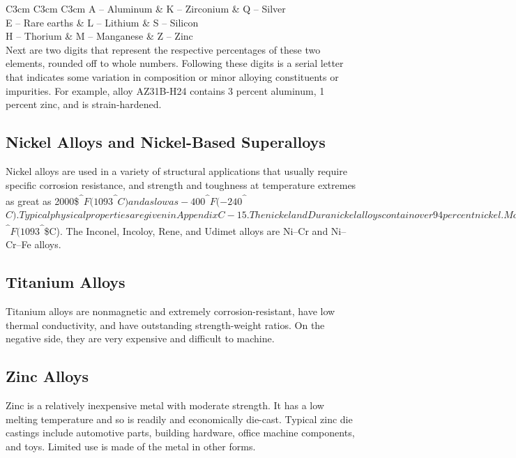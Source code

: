 \documentclass[a4paper,openany,12pt]{book}
\begin{document}
 C3cm C3cm C3cm A -- Aluminum \& K -- Zirconium \& Q -- Silver\\
E -- Rare earths \& L -- Lithium \& S -- Silicon\\
H -- Thorium \& M -- Manganese \& Z -- Zinc\\

Next are two digits that represent the respective percentages of these
two elements, rounded off to whole numbers. Following these digits is a
serial letter that indicates some variation in composition or minor
alloying constituents or impurities. For example, alloy AZ31B-H24
contains 3 percent aluminum, 1 percent zinc, and is strain-hardened.

\subsection{Nickel Alloys and Nickel-Based Superalloys}
\label{nickel-alloys-and-nickel-based-superalloys}
Nickel alloys are used in a variety of structural applications that
usually require specific corrosion resistance, and strength and
toughness at temperature extremes as great as 2000\$\textsuperscript{\^{}}\(F
(1093\)\textsuperscript{\^{}}\(C) and as low as -400\)\textsuperscript{\^{}}\(F (-240\)\textsuperscript{\^{}}\(C). Typical
physical properties are given in Appendix C-15. The nickel and
Duranickel alloys contain over 94 percent nickel. Monel represents a
series of nickel--copper alloys, based on the mutual solubility of these
two elements in all proportions. They are strong and tough at subzero
temperatures, and especially resistant to stress corrosion cracking.
Hastelloy designates a series of Ni--Mo and Ni--Mo--Cr superalloys.
Several Hastelloys resist oxidation and maintain useful strength and
creep properties in the range of 2000\)\textsuperscript{\^{}}\(F (1093\)\textsuperscript{\^{}}\$C). The
Inconel, Incoloy, Rene, and Udimet alloys are Ni--Cr and Ni--Cr--Fe
alloys.

\subsection{Titanium Alloys}
\label{titanium-alloys}
Titanium alloys are nonmagnetic and extremely corrosion-resistant, have
low thermal conductivity, and have outstanding strength-weight ratios.
On the negative side, they are very expensive and difficult to machine.

\subsection{Zinc Alloys}
\label{zinc-alloys}
Zinc is a relatively inexpensive metal with moderate strength. It has a
low melting temperature and so is readily and economically die-cast.
Typical zinc die castings include automotive parts, building hardware,
office machine components, and toys. Limited use is made of the metal in
other forms.
\end{document}
